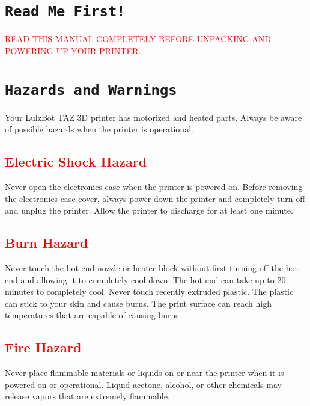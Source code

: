 %
%
%
%
%

\section{\texttt{Read Me First!}}
\textcolor{red}{READ THIS MANUAL COMPLETELY BEFORE UNPACKING AND POWERING UP YOUR PRINTER.}

\section{\texttt{Hazards and Warnings}}

Your LulzBot\textsuperscript{\miniscule{\textregistered}} TAZ 3D printer has motorized and heated parts.  Always be aware of possible hazards when the printer is operational.


\subsection{\textcolor{red}{Electric Shock Hazard}}
Never open the electronics case when the printer is powered on. Before removing the electronics case cover, always power down the printer and completely turn off and unplug the printer. Allow the printer to discharge for at least one minute.

\subsection{\textcolor{red}{Burn Hazard}}
Never touch the hot end nozzle or heater block without first turning off the hot end and allowing it to completely cool down. The hot end can take up to 20 minutes to completely cool. Never touch recently extruded plastic. The plastic can stick to your skin and cause burns. The print surface can reach high temperatures that are capable of causing burns.

\subsection{\textcolor{red}{Fire Hazard}}
Never place flammable materials or liquids on or near the printer when it is powered on or operational. Liquid acetone, alcohol, or other chemicals may release vapors that are extremely flammable.

